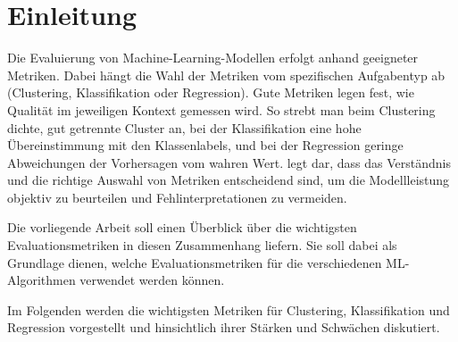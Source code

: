 \chapter{Einleitung}

Die Evaluierung von Machine-Learning-Modellen erfolgt anhand geeigneter
Metriken. Dabei hängt die Wahl der Metriken vom
spezifischen Aufgabentyp ab (Clustering, Klassifikation oder Regression). Gute Metriken
legen fest, wie Qualität im jeweiligen Kontext gemessen wird. So strebt man
beim Clustering dichte, gut getrennte Cluster an, bei der Klassifikation eine
hohe Übereinstimmung mit den Klassenlabels, und bei der Regression geringe
Abweichungen der Vorhersagen vom wahren Wert. \cite{Miller2024} legt dar,
dass das Verständnis und die richtige Auswahl von Metriken entscheidend sind,
um die Modellleistung objektiv zu beurteilen und Fehlinterpretationen zu
vermeiden. 

Die vorliegende Arbeit soll einen Überblick über die wichtigsten Evaluationsmetriken in diesen Zusammenhang liefern.
Sie soll dabei als Grundlage dienen, welche Evaluationsmetriken für die verschiedenen ML-Algorithmen verwendet werden können.

Im Folgenden werden die wichtigsten Metriken für Clustering, Klassifikation und Regression vorgestellt
und hinsichtlich ihrer Stärken und Schwächen diskutiert.

